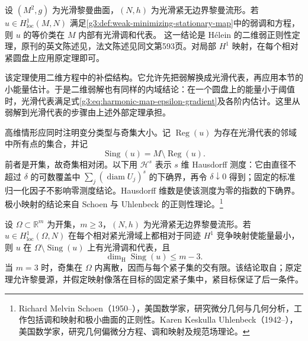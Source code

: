 \begin{theorem}[Hélein]\label{g3:thm:helein-weak-regularity}
	设 \((M^2,g)\) 为光滑黎曼曲面，\((N,h)\) 为光滑紧无边界黎曼流形。若 \(u\in H^1_{\mathrm{loc}}(M,N)\) 满足\cref{g3:def:weak-minimizing-stationary-map}中的弱调和方程，则 \(u\) 的等价类在 \(M\) 内部有光滑调和代表。
	这一结论是 Hélein 的二维弱正则性定理，原刊的英文陈述见\cite[第591页，未编号定理]{Helein1991WeakHarmonicRegularity}，法文陈述见同文第593页。对局部 \(H^1\) 映射，在每个相对紧圆盘上应用原定理即可。
\end{theorem}

该定理使用二维方程中的补偿结构。它允许先把弱解换成光滑代表，再应用本节的小能量估计。于是二维弱解也有同样的内域结论：在一个圆盘上的能量小于阈值时，光滑代表满足式\eqref{g3:eq:harmonic-map-epsilon-gradient}及各阶内估计。这里从弱解到光滑代表的步骤由上述外部定理承担。

\ProseParagraphBreak

高维情形应同时注明变分类型与奇集大小。记 \(\operatorname{Reg}(u)\) 为存在光滑代表的邻域中所有点的集合，并记
\[
	\operatorname{Sing}(u)=M\setminus\operatorname{Reg}(u).
\]
前者是开集，故奇集相对闭。以下用 \(\mathcal H^s\) 表示 \(s\) 维 Hausdorff 测度：它由直径不超过 \(\delta\) 的可数覆盖中 \(\sum_j(\operatorname{diam}U_j)^s\) 的下确界，再令 \(\delta\downarrow0\) 得到；固定的标准归一化因子不影响零测度结论。Hausdorff 维数是使该测度为零的指数的下确界。极小映射的结论来自 Schoen 与 Uhlenbeck 的正则性理论。\footnote{Richard Melvin Schoen（1950--），美国数学家，研究微分几何与几何分析，工作包括调和映射和极小曲面的正则性。Karen Keskulla Uhlenbeck（1942--），美国数学家，研究几何偏微分方程、调和映射及规范场理论。}

\begin{theorem}\label{g3:thm:minimizing-map-partial-regularity}
	设 \(\Omega\subset\mathbb R^m\) 为开集，\(m\ge3\)，\((N,h)\) 为光滑紧无边界黎曼流形。若 \(u\in H^1_{\mathrm{loc}}(\Omega,N)\) 在每个相对紧光滑域上都相对于同迹 \(H^1\) 竞争映射使能量最小，则 \(u\) 在 \(\Omega\setminus\operatorname{Sing}(u)\) 上有光滑调和代表，且
	\[
		\dim_{\mathrm H}\operatorname{Sing}(u)\le m-3.
	\]
	当 \(m=3\) 时，奇集在 \(\Omega\) 内离散，因而与每个紧子集的交有限。该结论取自\cite[第310页，定理II]{SchoenUhlenbeck1982Regularity}；原定理允许黎曼源，并假定映射像落在目标的固定紧子集中，紧目标保证了后一条件。
\end{theorem}

